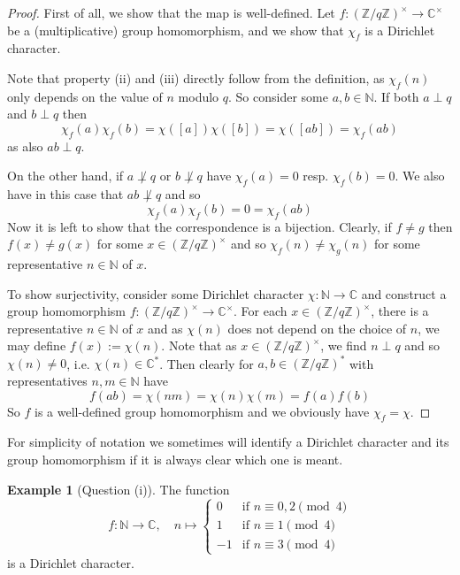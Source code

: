 \documentclass{scrartcl}
\newcommand{\N}{\mathbb{N}}
\newcommand{\Z}{\mathbb{Z}}
\newcommand{\C}{\mathbb{C}}
\newcommand{\units}{\times}
\theoremstyle{definition}
\newtheorem{example}[definition]{Example}
\begin{document}
\begin{proof}
    First of all, we show that the map is well-defined. Let $f: (\Z/q\Z)^\units \to \C^\units$ be a (multiplicative) group homomorphism, and we show that $\chi_f$ is a Dirichlet character.
    
    Note that property (ii) and (iii) directly follow from the definition, as $\chi_f(n)$ only depends on the value of $n$ modulo $q$.
    So consider some $a, b \in \N$.
    If both $a \perp q$ and $b \perp q$ then
    \begin{equation*}
        \chi_f(a)\chi_f(b) = \chi([a])\chi([b]) = \chi([ab]) = \chi_f(ab)
    \end{equation*}
    as also $ab \perp q$.

    On the other hand, if $a \not\perp q$ or $b \not\perp q$ have $\chi_f(a) = 0$ resp. $\chi_f(b) = 0$.
    We also have in this case that $ab \not\perp q$ and so
    \begin{equation*}
        \chi_f(a)\chi_f(b) = 0 = \chi_f(ab)
    \end{equation*}
    Now it is left to show that the correspondence is a bijection.
    Clearly, if $f \neq g$ then $f(x) \neq g(x)$ for some $x \in (\Z/q\Z)^\units$ and so $\chi_f(n) \neq \chi_g(n)$ for some representative $n \in \N$ of $x$.
    
    To show surjectivity, consider some Dirichlet character $\chi: \N \to \C$ and construct a group homomorphism $f: (\Z/q\Z)^\units \to \C^\units$. 
    For each $x \in (\Z/q\Z)^\units$, there is a representative $n \in \N$ of $x$ and as $\chi(n)$ does not depend on the choice of $n$, we may define $f(x) := \chi(n)$.
    Note that as $x \in (\Z/q\Z)^\units$, we find $n \perp q$ and so $\chi(n) \neq 0$, i.e. $\chi(n) \in \C^*$.
    Then clearly for $a, b \in (\Z/q\Z)^*$ with representatives $n, m \in \N$ have
    \begin{equation*}
        f(ab) = \chi(nm) = \chi(n)\chi(m) = f(a)f(b)
    \end{equation*}
    So $f$ is a well-defined group homomorphism and we obviously have $\chi_f = \chi$.
\end{proof}
For simplicity of notation we sometimes will identify a Dirichlet character and its group homomorphism if it is always clear which one is meant.
\begin{example}[Question (i)]
    \label{ex:nontrivial_dirichlet_character_mod_4}
    The function
    \begin{equation*}
        f: \N \to \C, \quad n \mapsto \begin{cases}
            0 & \text{if $n \equiv 0, 2 \pmod 4$} \\
            1 & \text{if $n \equiv 1 \pmod 4$} \\
            -1 & \text{if $n \equiv 3 \pmod 4$}
        \end{cases}
    \end{equation*}
    is a Dirichlet character.
\end{example}
\end{document}
